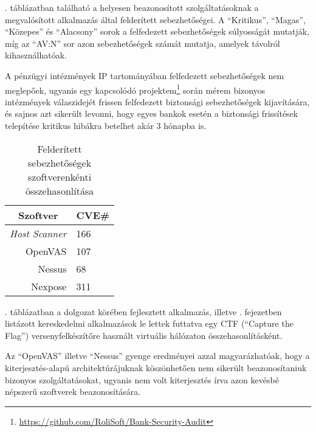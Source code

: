 	\Az{\ref{cpevulns_hu}}. táblázatban található a helyesen beazonosított szolgáltatásoknak a megvalósított alkalmazás által felderített sebezhetőségei. A ``Kritikus'', ``Magas'', ``Közepes'' és ``Alacsony'' sorok a felfedezett sebezhetőségek súlyosságát mutatják, míg az ``AV:N'' sor azon sebezhetőségek számát mutatja, amelyek távolról kihasználhatóak.
	
	A pénzügyi intézmények IP tartományában felfedezett sebezhetőségek nem meglepőek, ugyanis egy kapcsolódó projektem\footnote{\url{https://github.com/RoliSoft/Bank-Security-Audit}} során mérem bizonyos intézmények válaszidejét frissen felfedezett biztonsági sebezhetőségek kijavítására, és sajnos azt sikerült levonni, hogy egyes bankok esetén a biztonsági frissítések telepítése kritikus hibákra betelhet akár 3 hónapba is.
	
	\begin{table}[H]
		\centering
		\begin{tabular}{|r|l|}
			\hline
			\multicolumn{1}{|c|}{\textbf{Szoftver}} & \multicolumn{1}{c|}{\textbf{CVE\#}} \\ \hline
			\textit{Host Scanner\footnotemark{}}                   & 166                                 \\
			OpenVAS                                 & 107                                 \\
			Nessus                                  & 68                                  \\
			Nexpose                                 & 311                                 \\ \hline
		\end{tabular}
		\caption{Felderített sebezhetőségek szoftverenkénti összehasonlítása}
		\label{foundvulns_hu}
	\end{table}
	
	\Az{\ref{foundvulns_hu}}. táblázatban a dolgozat körében fejlesztett alkalmazás, illetve \az{\ref{comtools}}. fejezetben listázott kereskedelmi alkalmazások le lettek futtatva egy CTF (``Capture the Flag'') versenyfelkészítőre használt virtuális hálózaton összehasonlításként.
	
	Az ``OpenVAS'' illetve ``Nessus'' gyenge eredményei azzal magyarázhatóak, hogy a kiterjesztés-alapú architektúrájuknak köszönhetően nem sikerült beazonosítaniuk bizonyos szolgáltatásokat, ugyanis nem volt kiterjesztés írva azon kevésbé népszerű szoftverek beazonosítására.
	
